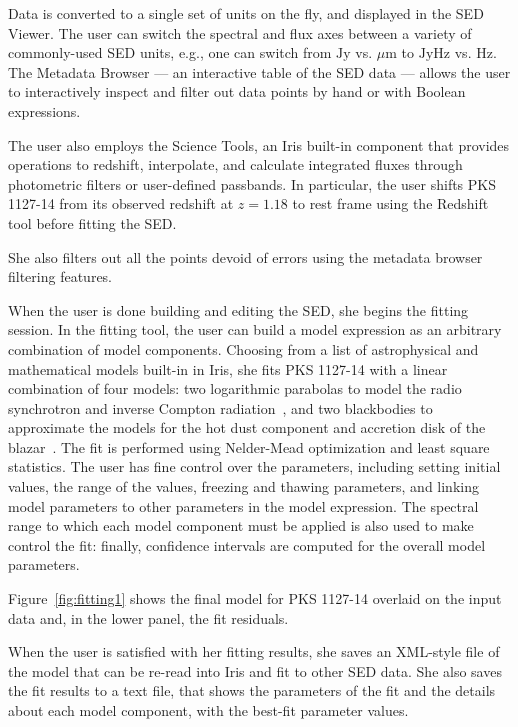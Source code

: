 \documentclass[final,5p,authoryear]{elsarticle}
\begin{document}
Data is converted to a single set of units on the fly, and displayed in the SED
Viewer. The user can switch the spectral and flux axes between a variety of
commonly-used SED units, e.g., one can switch from $\mathrm{Jy}$ vs.
${\mu}\mathrm{m}$ to $\mathrm{Jy}\mathrm{Hz}$ vs. $\mathrm{Hz}$. The Metadata
Browser --- an interactive table of the SED data --- allows the user to
interactively inspect and filter out data points by hand or with Boolean
expressions.

The user also employs the Science Tools, an Iris built-in component that
provides operations to redshift, interpolate, and calculate integrated fluxes
through photometric filters or user-defined passbands. In particular, the user
shifts PKS 1127-14 from its observed redshift at $z=1.18$ to rest frame using
the Redshift tool before fitting the SED.

She also filters out all the points devoid of errors using the metadata browser
filtering features.

When the user is done building and editing the SED, she begins the fitting
session. In the fitting tool, the user can build a model expression as an
arbitrary combination of model components. Choosing from a list of astrophysical
and mathematical models built-in in Iris, she fits PKS 1127-14 with a linear
combination of four models: two logarithmic parabolas to model the radio
synchrotron and inverse Compton radiation~\citep{2006A&A...448..861M,2009A&A...501..879T}, and two blackbodies to approximate
the models for the hot dust component and accretion disk of the blazar~\citep{2002ApJ...575..667D}. The fit
is performed using Nelder-Mead optimization and least square statistics. The user
has fine control over the parameters, including setting initial values, the
range of the values, freezing and thawing parameters, and linking model
parameters to other parameters in the model expression. The spectral range to
which each model component must be applied is also used to make control the fit:
finally, confidence intervals are computed for the overall model parameters.

Figure~\ref{fig:fitting1} shows the final model for PKS 1127-14 overlaid on the
input data and, in the lower panel, the fit residuals.

When the user is satisfied with her fitting results, she saves an XML-style file
of the model that can be re-read into Iris and fit to other SED data. She also
saves the fit results to a text file, that shows the parameters of the fit and
the details about each model component, with the best-fit parameter values.
\end{document}
